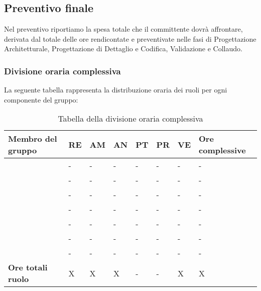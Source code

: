 \subsection{Preventivo finale} 
Nel preventivo riportiamo la spesa totale che il committente dovrà affrontare, derivata dal totale delle ore rendicontate e preventivate nelle fasi di Progettazione Architetturale, Progettazione di Dettaglio e Codifica, Validazione e Collaudo.

\subsubsection{Divisione oraria complessiva} 
La seguente tabella rappresenta la distribuzione oraria dei ruoli per ogni componente del gruppo:
{
\renewcommand{\arraystretch}{2}
\begin{longtable}[h!] { C{4cm} C{1cm} C{1cm} C{1cm} C{1cm} C{1cm} C{1cm} C{3cm}}
\caption{Tabella della divisione oraria complessiva}	\\
\rowcolor{\primaryColor}

\textcolor{\secondaryColor}{\textbf{Membro del gruppo}} & 
\textcolor{\secondaryColor}{\textbf{RE}} & 
\textcolor{\secondaryColor}{\textbf{AM}} & 
\textcolor{\secondaryColor}{\textbf{AN}} & 
\textcolor{\secondaryColor}{\textbf{PT}} & 
\textcolor{\secondaryColor}{\textbf{PR}} & 
\textcolor{\secondaryColor}{\textbf{VE}} & 
\textcolor{\secondaryColor}{\textbf{Ore complessive}}\\	
\endhead

\AD{}                     &  - &  - &  - & - & - & - & - \\
\AT{}                     &  - &  - &  - & - & - & - & - \\
\AW{}                     &  - &  - &  - & - & - & - & - \\
\EC{}                     &  - &  - &  - & - & - & - & - \\
\EM{}                     &  - &  - &  - & - & - & - & - \\
\FP{}                     &  - &  - &  - & - & - & - & - \\
\GG{}                     &  - &  - &  - & - & - & - & - \\
\textbf{Ore totali ruolo} & X & X & X & - & - & X & X \\
\end{longtable}
}

